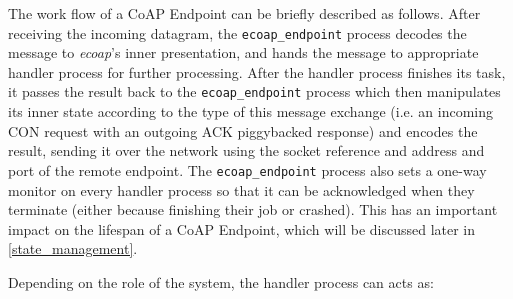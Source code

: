 The work flow of a CoAP Endpoint can be briefly described as follows. After receiving the incoming datagram, the \verb|ecoap_endpoint| process decodes the message to \textit{ecoap}'s inner presentation, and hands the message to appropriate handler process for further processing. After the handler process finishes its task, it passes the result back to the \verb|ecoap_endpoint| process which then manipulates its inner state according to the type of this message exchange (i.e. an incoming CON request with an outgoing ACK piggybacked response) and encodes the result, sending it over the network using the socket reference and address and port of the remote endpoint. The \verb|ecoap_endpoint| process also sets a one-way monitor on every handler process so that it can be acknowledged when they terminate (either because finishing their job or crashed). This has an important impact on the lifespan of a CoAP Endpoint, which will be discussed later in \ref{state_management}. 

\begin{figure}
\label{fig:coap_endpoint}
\end{figure}

Depending on the role of the system, the handler process can acts as:

